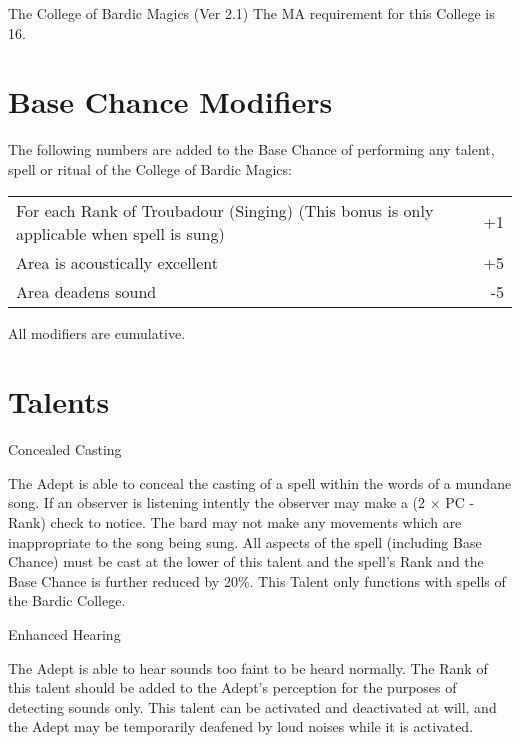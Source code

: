 \begin{Chapter}{The College of Bardic Magics (Ver 2.1)}
The MA requirement for this College is 16. 

\section{Base Chance Modifiers}

The following numbers are added to the Base Chance of performing any
talent, spell or ritual of the College of Bardic Magics:

\begin{tabularx}{\columnwidth}{Xr}
For each Rank of Troubadour (Singing) (This bonus is only applicable when spell is sung)	& +1 \\
Area is acoustically excellent	& +5 \\
Area deadens sound		& -5 \\
\end{tabularx}

All modifiers are cumulative. 

\section{Talents}

\begin{talent}[T-1]{Concealed Casting}

\begin{effects}
The Adept is able to conceal the casting of a spell within the words
of a mundane song.  If an observer is listening intently the observer
may make a (2 × PC - Rank) check to notice. The bard may not make any
movements which are inappropriate to the song being sung.  All aspects
of the spell (including Base Chance) must be cast at the lower of this
talent and the spell’s Rank and the Base Chance is further reduced by
20\%. This Talent only functions with spells of the Bardic College.
\end{effects}
\end{talent}

\begin{talent}[T-2]{Enhanced Hearing}

\begin{effects}
The Adept is able to hear sounds too faint to be heard normally.  The
Rank of this talent should be added to the Adept’s perception for the
purposes of detecting sounds only.  This talent can be activated and
deactivated at will, and the Adept may be temporarily deafened by loud
noises while it is activated.
\end{effects}
\end{talent}



\end{Chapter}
